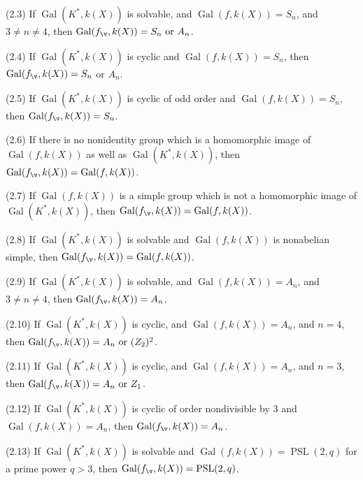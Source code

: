 {\rm(2.3)} If $\operatorname{Gal}(K^*,k(X))$ is solvable, 
and $\operatorname{Gal}(f,k(X))=S_n$, 
and $3\ne n\ne 4$, then 
$\operatorname{Gal}(f_{\v},k(X))=S_n\text{ or }A_n$.

{\rm(2.4)} If $\operatorname{Gal}(K^*,k(X))$ is cyclic and 
$\operatorname{Gal}(f,k(X))=S_n$, 
then %
$\operatorname{Gal}(f_{\v},k(X)) =S_n$ or $A_n$.

{\rm(2.5)} If $\operatorname{Gal}(K^*,k(X))$ is cyclic of 
odd order and 
$\operatorname{Gal}(f,k(X))=S_n$, then %
$\operatorname{Gal}(f_{\v},k(X))=S_n$.

{\rm(2.6)} If there is no nonidentity group which is a 
homomorphic
image of$\operatorname{Gal}
(f,k(X))$ as well as  $\operatorname{Gal}(K^*,k(X))$, then
$\operatorname{Gal}(f_{\v},k(X))=%
\operatorname{Gal}(f,k(X))$.

{\rm(2.7)} If $\operatorname{Gal}(f,k(X))$ is a simple 
group which is not a 
homomorphic image of %
$\operatorname{Gal}(K^*,k(X))$, then
$\operatorname{Gal}(f_{\v},k(X))=%
\operatorname{Gal}(f,k(X))$.

{\rm(2.8)} If $\operatorname{Gal}(K^*,k(X))$ is solvable 
and $\operatorname{Gal}(f,k(X))$ is  
nonabelian simple, then %
$\operatorname{Gal}(f_{\v},k(X))=%
\operatorname{Gal}(f,k(X))$.

{\rm(2.9)} If $\operatorname{Gal}(K^*,k(X))$ is solvable, 
and $\operatorname{Gal}(f,k(X))=A_n$, and
$3\ne n\ne 4$, then %
$\operatorname{Gal}(f_{\v},k(X))=A_n$.

{\rm(2.10)} If $\operatorname{Gal}(K^*,k(X))$ is cyclic, and
$\operatorname{Gal}(f,k(X))=A_n$, and $n=4$, then %
$\operatorname{Gal}(f_{\v},k(X))=A_n\text{ or }(Z_2)^2$.

{\rm(2.11)} If $\operatorname{Gal}(K^*,k(X))$ is cyclic, 
and 
$\operatorname{Gal}(f,k(X))=A_n$, and $n=3$, then %
$\operatorname{Gal}(f_{\v},k(X))=A_n\text{ or }Z_1$.

{\rm(2.12)} If $\operatorname{Gal}(K^*,k(X))$ is cyclic of 
order nondivisible by $3$
 and 
$\operatorname{Gal}(f,k(X)) =A_n$, then 
$\operatorname{Gal}(f_{\v},k(X))=A_n$.

{\rm(2.13)} If $\operatorname{Gal}(K^*,k(X))$ is solvable 
and 
$\operatorname{Gal}(f,k(X))=\operatorname{PSL}(2,q)$ for a 
prime power $q>3$, 
then $\operatorname{Gal}(f_{\v},k(X))=%
\operatorname{PSL}(2,q)$.

